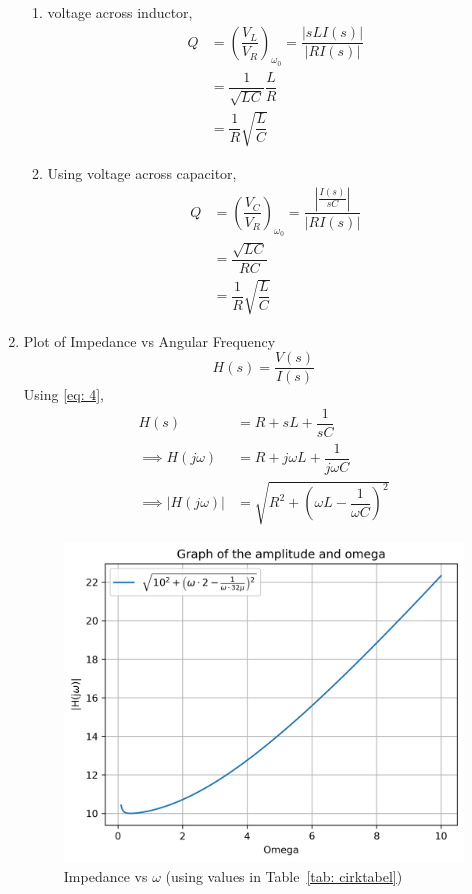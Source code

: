 \documentclass[journal,12pt,twocolumn]{IEEEtran}
\newcommand\tabref{Table~\ref}
\theoremstyle{remark}
\providecommand{\abs}[1]{\left\vert#1\right\vert}
\begin{document}
\begin{enumerate}
\begin{enumerate}
\item voltage across inductor,
\begin{align}
    Q &= \left(\dfrac{V_L}{V_R}\right)_{\omega_0} = \dfrac{\lvert{sLI(s)}\rvert}{\lvert RI(s) \rvert}\\
    &= \dfrac{1}{\sqrt{LC}}\dfrac{L}{R}\\
    &= \dfrac{1}{R}\sqrt{\dfrac{L}{C}}
\end{align}
\item Using voltage across capacitor,
\begin{align}
	Q &= \left(\dfrac{V_C}{V_R}\right)_{\omega_0} = \dfrac{\abs{\frac{I(s)}{sC}}}{\lvert RI(s) \rvert}\\
    &= \dfrac{\sqrt{LC}}{RC}\\
    &= \dfrac{1}{R}\sqrt{\dfrac{L}{C}}
\end{align}
\end{enumerate}
\item{Plot of Impedance vs Angular Frequency}
\begin{equation}
    H(s) = \dfrac{V(s)}{I(s)}
\end{equation}
Using \eqref{eq: 4},
\begin{align}
     H(s) &= R + sL + \dfrac{1}{sC}\\
     \implies H(j\omega) &= R + j\omega L + \dfrac{1}{j\omega C}\\
     \implies \lvert H(j\omega) \rvert &= \sqrt{R^2 + \left(\omega L - \dfrac{1}{\omega C}\right)^2}
\end{align}
\begin{figure}[!h]
    \centering
    \includegraphics[width = \columnwidth]{figs/q_plot.png}
    \caption{Impedance vs $\omega$ (using values in \tabref{tab: cirktabel})}
    \label{fig:h_plot}
\end{figure}
\end{enumerate}
\end{document}
